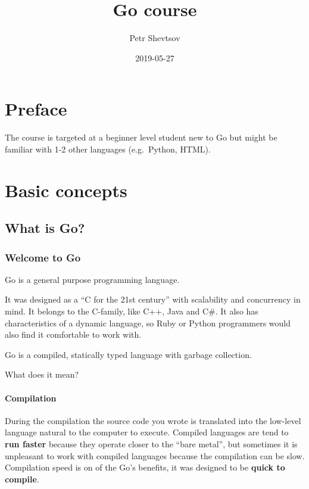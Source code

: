 \documentclass[]{book}
\title{Go course}
\author{Petr Shevtsov}
\date{2019-05-27}
\begin{document}
\maketitle

{
\setcounter{tocdepth}{1}
\tableofcontents
}
\hypertarget{preface}{%
\chapter*{Preface}\label{preface}}

The course is targeted at a beginner level student new to Go but might be
familiar with 1-2 other languages (e.g.~Python, HTML).

\hypertarget{basic-concepts}{%
\chapter{Basic concepts}\label{basic-concepts}}

\hypertarget{what-is-go}{%
\section{What is Go?}\label{what-is-go}}

\hypertarget{welcome-to-go}{%
\subsection{Welcome to Go}\label{welcome-to-go}}

Go is a general purpose programming language.

It was designed as a ``C for the 21st century'' with scalability and concurrency
in mind. It belongs to the C-family, like C++, Java and C\#. It also has
characteristics of a dynamic language, so Ruby or Python programmers would also
find it comfortable to work with.

Go is a compiled, statically typed language with garbage collection.

What does it mean?

\hypertarget{compilation}{%
\subsubsection*{Compilation}\label{compilation}}

During the compilation the source code you wrote is translated into the
low-level language natural to the computer to execute. Compiled languages are
tend to \textbf{run faster} because they operate closer to the ``bare metal'', but
sometimes it is unpleasant to work with compiled languages because the
compilation can be slow. Compilation speed is on of the Go's benefits, it was
designed to be \textbf{quick to compile}.
\end{document}
